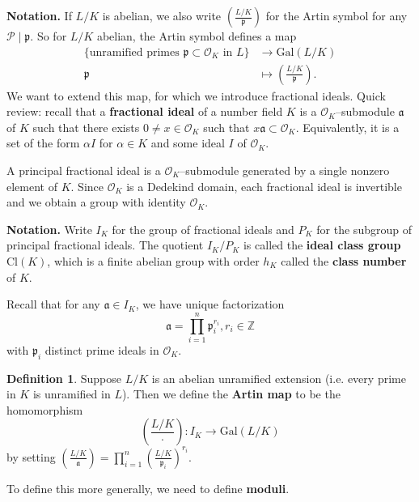 \documentclass{article}
\theoremstyle{definition}
\newtheorem{defn}[theorem]{Definition}
\begin{document}
\textbf{Notation.} If $L/K$ is abelian, we also write $\left(\frac{L/K}{\mathfrak{p}}\right)$ for the Artin symbol for any $\mathcal{P} \mid \mathfrak{p}$. So for $L/K$ abelian, the Artin symbol defines a map 
\begin{align*}
    \{\text{unramified primes }\mathfrak{p} \subset \mathcal{O}_K \text{ in }L\} &\to \text{Gal}(L/K) \\
    \mathfrak{p} &\mapsto \left(\frac{L/K}{\mathfrak{p}}\right).
\end{align*}
We want to extend this map, for which we introduce fractional ideals. Quick review: recall that a \textbf{fractional ideal} of a number field $K$ is a $\mathcal{O}_K$--submodule $\mathfrak{a}$ of $K$ such that there exists $0 \neq x \in \mathcal{O}_K$ such that $x \mathfrak{a} \subset \mathcal{O}_K$. Equivalently, it is a set of the form $\alpha I$ for $\alpha \in K$ and some ideal $I$ of $\mathcal{O}_K$.
\vspace{1mm}
 
A principal fractional ideal is a $\mathcal{O}_K$--submodule generated by a single nonzero element of $K$. Since $\mathcal{O}_K$ is a Dedekind domain, each fractional ideal is invertible and we obtain a group with identity $\mathcal{O}_K$.
\vspace{1mm}
 
\textbf{Notation.} Write $I_K$ for the group of fractional ideals and $P_K$ for the subgroup of principal fractional ideals. The quotient $I_K/P_K$ is called the \textbf{ideal class group} $\text{Cl}(K)$, which is a finite abelian group with order $h_K$ called the \textbf{class number} of $K$.
\vspace{1mm}
 
Recall that for any $\mathfrak{a} \in I_K$, we have unique factorization \[
\mathfrak{a} = \prod_{i=1}^{n} \mathfrak{p}_i^{r_i}, r_i \in \mathbb{Z}
\]
with $\mathfrak{p}_i$ distinct prime ideals in $\mathcal{O}_K$.

\begin{defn}
    Suppose $L/K$ is an abelian unramified extension (i.e. every prime in $K$ is unramified in $L$). Then we define the \textbf{Artin map} to be the homomorphism \[
    \left(\frac{L/K}{\cdot }\right) : I_K \to \text{Gal}(L/K)
    \]
    by setting $\left(\frac{L/K}{\mathfrak{a}}\right) = \prod_{i=1}^{n} \left(\frac{L/K}{\mathfrak{p}_i}\right)^{r_i}$.
\end{defn}
To define this more generally, we need to define \textbf{moduli}.
\vspace{1mm}
 
\end{document}
